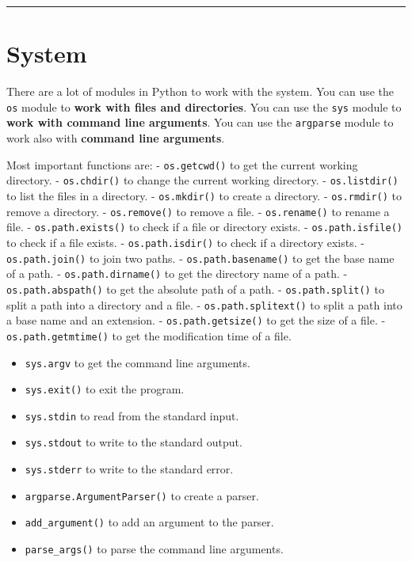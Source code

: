 \documentclass[
  letterpaper,
  DIV=11,
  numbers=noendperiod]{scrreprt}
\begin{document}
\begin{center}\rule{0.5\linewidth}{0.5pt}\end{center}

\chapter*{System}\label{system}


There are a lot of modules in Python to work with the system. You can
use the \texttt{os} module to \textbf{work with files and directories}.
You can use the \texttt{sys} module to \textbf{work with command line
arguments}. You can use the \texttt{argparse} module to work also with
\textbf{command line arguments}.

Most important functions are: - \texttt{os.getcwd()} to get the current
working directory. - \texttt{os.chdir()} to change the current working
directory. - \texttt{os.listdir()} to list the files in a directory. -
\texttt{os.mkdir()} to create a directory. - \texttt{os.rmdir()} to
remove a directory. - \texttt{os.remove()} to remove a file. -
\texttt{os.rename()} to rename a file. - \texttt{os.path.exists()} to
check if a file or directory exists. - \texttt{os.path.isfile()} to
check if a file exists. - \texttt{os.path.isdir()} to check if a
directory exists. - \texttt{os.path.join()} to join two paths. -
\texttt{os.path.basename()} to get the base name of a path. -
\texttt{os.path.dirname()} to get the directory name of a path. -
\texttt{os.path.abspath()} to get the absolute path of a path. -
\texttt{os.path.split()} to split a path into a directory and a file. -
\texttt{os.path.splitext()} to split a path into a base name and an
extension. - \texttt{os.path.getsize()} to get the size of a file. -
\texttt{os.path.getmtime()} to get the modification time of a file.

\begin{itemize}
\item
  \texttt{sys.argv} to get the command line arguments.
\item
  \texttt{sys.exit()} to exit the program.
\item
  \texttt{sys.stdin} to read from the standard input.
\item
  \texttt{sys.stdout} to write to the standard output.
\item
  \texttt{sys.stderr} to write to the standard error.
\item
  \texttt{argparse.ArgumentParser()} to create a parser.
\item
  \texttt{add\_argument()} to add an argument to the parser.
\item
  \texttt{parse\_args()} to parse the command line arguments.
\end{itemize}
\end{document}
